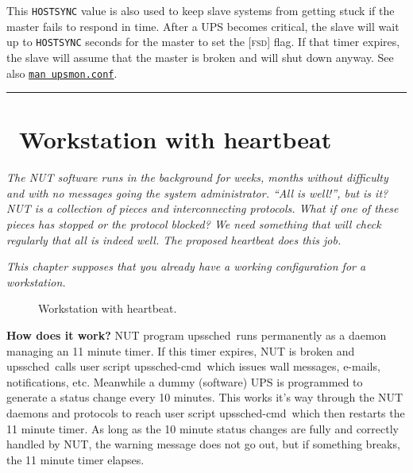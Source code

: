 \documentclass[12pt]{article}
\newlength{\headersep}\setlength{\headersep}{3mm}
\newcommand{\Hsep}{\hspace{\headersep}}
\newcommand{\newcolumn}{\vfill\eject}
\newcommand{\upssched}{\mbox{\textcolor{SCHEDCOLOUR}{upssched}}}
\newcommand{\upsschedcmd}{\mbox{\textcolor{CMDCOLOUR}{upssched-cmd}}}
\newcommand{\FSDst}{\textcolor{UPSDCOLOUR}{\textsc{fsd}}}
\newcommand{\status}[1]{\textcolor{UPSDCOLOUR}{[{#1}]}}
\newcommand{\NUTman}[1]{\href{http://networkupstools.org/docs/man/#1.html}{\texttt{man #1}}}
\begin{document}
This \texttt{HOSTSYNC} value is also used to keep slave systems from getting
stuck if the master fails to respond in time. After a UPS becomes critical,
the slave will wait up to \texttt{HOSTSYNC} seconds for the master to set the
\status{\FSDst} flag. If that timer expires, the slave will assume that the
master is broken and will shut down anyway.  See also \NUTman{upsmon.conf}.



\vspace*{\fill}
\begin{center}\rule{\LinePrinterwidth}{0.5mm}\end{center}
\vspace*{\fill}

\begin{center}
\end{center}

\vspace*{\fill}

\newcolumn
\section{\Hsep\ Workstation with heartbeat}\label{heartbeat}

\textsl{The NUT software runs in the background for weeks, months without
  difficulty and with no messages going the system administrator.  ``All is
  well!'', but is it?  NUT is a collection of pieces and interconnecting
  protocols.  What if one of these pieces has stopped or the protocol blocked?
  We need something that will check regularly that all is indeed well.  The
  proposed heartbeat does this job.}

\textsl{This chapter supposes that you already have a working configuration
  for a workstation.}

\begin{figure}[ht]
\begin{center}
\end{center}
\vspace{-6mm}
\caption{Workstation with heartbeat.\label{fig:heartbeat}}
\end{figure}

\textbf{How does it work?} \quad NUT program \upssched\ runs permanently as a
daemon managing an 11 minute timer.  If this timer expires, NUT is broken and
\upssched\ calls user script \upsschedcmd\ which issues wall messages,
e-mails, notifications, etc.  Meanwhile a dummy (software) UPS is programmed
to generate a status change every 10 minutes.  This works it's way through the
NUT daemons and protocols to reach user script \upsschedcmd\ which then
restarts the 11 minute timer.  As long as the 10 minute status changes are
fully and correctly handled by NUT, the warning message does not go out, but
if something breaks, the 11 minute timer elapses.
\end{document}
